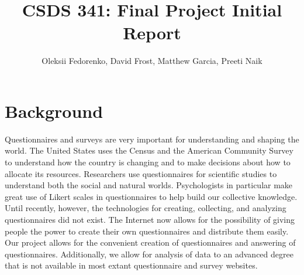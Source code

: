 \documentclass[12pt, oneside, a4paper]{article}
\title{CSDS 341: Final Project Initial Report}
\author{Oleksii Fedorenko, David Frost, Matthew Garcia, Preeti Naik}
\begin{document}
    \maketitle
    \section{Background}
    Questionnaires and surveys are very important for understanding and shaping the world. The United States uses the Census and the
    American Community Survey to understand how the country is changing and to make decisions about how to allocate its
    resources. Researchers use questionnaires for scientific studies to understand both the social and natural worlds.
    Psychologists in particular make great use of Likert scales in questionnaires to help build our collective knowledge.
    Until recently, however, the technologies for creating, collecting, and analyzing questionnaires did not exist.
    The Internet now allows for the possibility of giving people the power to create their own questionnaires and distribute
    them easily. Our project allows for the convenient creation of questionnaires and answering of questionnaires. Additionally,
    we allow for analysis of data to an advanced degree that is not available in most extant questionnaire and survey websites.
\end{document}
